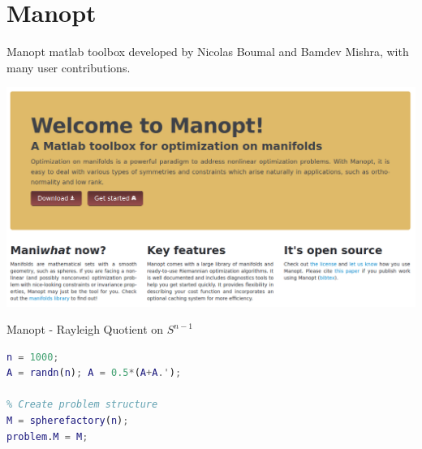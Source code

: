\documentclass[xcolor=dvipsnames,t]{beamer} %
\begin{document}
\section{Manopt}
\begin{frame}{Manopt}{}
   {\sc matlab} toolbox developed by Nicolas Boumal and Bamdev Mishra, with many user contributions.
   \begin{center}
      \includegraphics[width=\textwidth]{figures/manopt_org.png}
   \end{center}
\end{frame}


\begin{frame}[fragile]{Manopt - Rayleigh Quotient on $S^{n-1}$}
   
   \begin{lstlisting}[language=Matlab]
% Generate symmetric matrix
n = 1000;
A = randn(n); A = 0.5*(A+A.');

% Create problem structure
M = spherefactory(n);
problem.M = M;
   \end{lstlisting}

\end{frame}
\end{document}
